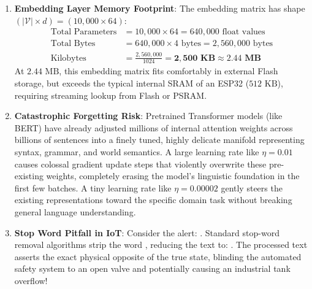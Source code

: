 \begin{enumerate}
    \item \textbf{Embedding Layer Memory Footprint}:
    The embedding matrix has shape $(|\mathcal{V}| \times d) = (10{,}000 \times 64)$:
    \begin{align*}
    \text{Total Parameters} &= 10{,}000 \times 64 = 640{,}000 \text{ float values} \\
    \text{Total Bytes} &= 640{,}000 \times 4 \text{ bytes} = 2{,}560{,}000 \text{ bytes} \\
    \text{Kilobytes} &= \frac{2{,}560{,}000}{1024} = \mathbf{2{,}500 \text{ KB}} \approx \mathbf{2.44 \text{ MB}}
    \end{align*}
    At $2.44\text{ MB}$, this embedding matrix fits comfortably in external Flash storage, but exceeds the typical internal SRAM of an ESP32 ($512\text{ KB}$), requiring streaming lookup from Flash or PSRAM.

    \item \textbf{Catastrophic Forgetting Risk}:
    Pretrained Transformer models (like BERT) have already adjusted millions of internal attention weights across billions of sentences into a finely tuned, highly delicate manifold representing syntax, grammar, and world semantics. 
    A large learning rate like $\eta = 0.01$ causes colossal gradient update steps that violently overwrite these pre-existing weights, completely erasing the model's linguistic foundation in the first few batches. A tiny learning rate like $\eta = 0.00002$ gently steers the existing representations toward the specific domain task without breaking general language understanding.

    \item \textbf{Stop Word Pitfall in IoT}:
    Consider the alert: .
    Standard stop-word removal algorithms strip the word , reducing the text to:
    .
    The processed text asserts the exact physical opposite of the true state, blinding the automated safety system to an open valve and potentially causing an industrial tank overflow!
\end{enumerate}
